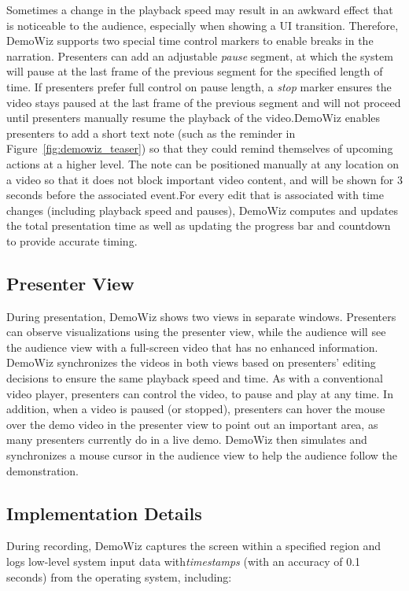 Sometimes a change in the playback speed may result in an awkward effect that is noticeable to the audience, especially when showing a UI transition. Therefore, DemoWiz supports two special time control markers to enable breaks in the narration. Presenters can add an adjustable \textit{pause} segment, at which the system will pause at the last frame of the previous segment for the specified length of time. If presenters prefer full control on pause length, a \textit{stop} marker ensures the video stays paused at the last frame of the previous segment and will not proceed until presenters manually resume the playback of the video.DemoWiz enables presenters to add a short text note (such as the reminder  in Figure~\ref{fig:demowiz_teaser}) so that they could remind themselves of upcoming actions at a higher level. The note can be positioned manually at any location on a video so that it does not block important video content, and will be shown for 3 seconds before the associated event.For every edit that is associated with time changes (including playback speed and pauses), DemoWiz computes and updates the total presentation time as well as updating the progress bar and countdown to provide accurate timing.


\subsection{Presenter View}
During presentation, DemoWiz shows two views in separate windows. Presenters can observe visualizations using the presenter view, while the audience will see the audience view with a full-screen video that has no enhanced information. DemoWiz synchronizes the videos in both views based on presenters' editing decisions to ensure the same playback speed and time. As with a conventional video player, presenters can control the video, to pause and play at any time. In addition, when a video is paused (or stopped), presenters can hover the mouse over the demo video in the presenter view to point out an important area, as many presenters currently do in a live demo. DemoWiz then simulates and synchronizes a mouse cursor in the audience view to help the audience follow the demonstration.


\subsection{Implementation Details}
During recording, DemoWiz captures the screen within a specified region and logs low-level system input data with\textit{timestamps} (with an accuracy of 0.1 seconds) from the operating system, including:

